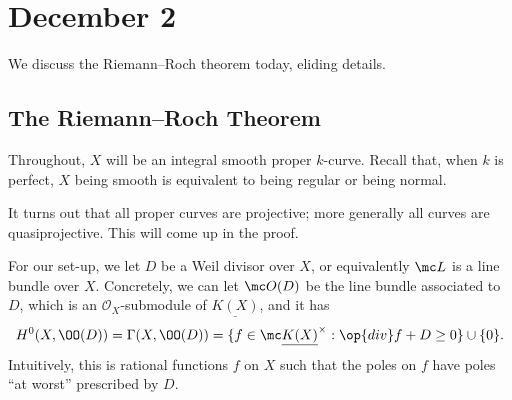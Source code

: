 \documentclass[../notes.tex]{subfiles}
\begin{document}
\section{December 2}

We discuss the Riemann--Roch theorem today, eliding details.

\subsection{The Riemann--Roch Theorem}
Throughout, $X$ will be an integral smooth proper $k$-curve. Recall that, when $k$ is perfect, $X$ being smooth is equivalent to being regular or being normal.
\begin{remark}
	It turns out that all proper curves are projective; more generally all curves are quasiprojective. This will come up in the proof.
\end{remark}
For our set-up, we let $D$ be a Weil divisor over $X$, or equivalently $\mc L$ is a line bundle over $X$. Concretely, we can let $\mc O(D)$ be the line bundle associated to $D$, which is an $\mathcal O_X$-submodule of $\underline{K(X)}$, and it has
\[H^0(X,\OO(D))=\Gamma(X,\OO(D))=\{f\in\mc\underline{K(X)}^\times:\op{div}f+D\ge0\}\cup\{0\}.\]
Intuitively, this is rational functions $f$ on $X$ such that the poles on $f$ have poles ``at worst'' prescribed by $D$.
\end{document}
